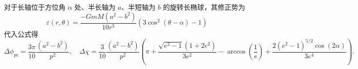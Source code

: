 \begin{example}
	对于长轴位于方位角 \(\alpha\) 处、半长轴为 \(a\)、半短轴为 \(b\) 的旋转长椭球，其修正势为
	\begin{equation*}
		\varepsilon (r, \theta) = \frac{-GmM (a^2 - b^2)}{10 r^3} \left(3 \cos^2 (\theta - \alpha) - 1\right)
	\end{equation*}
	代入公式得
	\begin{equation*}
		\Delta\phi_{\text{pr}} = \frac{3 \pi}{10} \frac{(a^2 - b^2)}{p^2},\quad\Delta\chi =
		\frac{3}{10} \frac{(a^2 - b^2)}{p^2} \left(
		\pi + \frac{\sqrt{e^2 - 1} (1 + 2 e^2)}{3 e^2}
		- \arccos \left(\frac{1}{e} \right)
		+ \frac{2 (e^2 - 1)^{5/2} \cos (2 \alpha)}{3 e^4}
		\right).
	\end{equation*}
\end{example}
